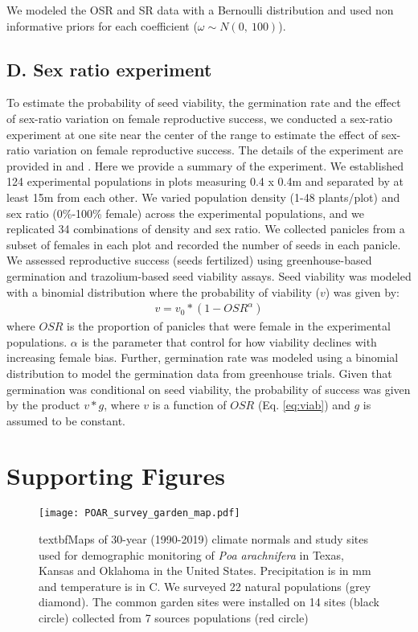 \documentclass[9pt,twoside,lineno]{pnas-new}
\begin{document}
We modeled the OSR and SR data with a Bernoulli distribution and used non informative priors for each coefficient ($\omega \sim N(0,\ 100)$). 

\subsection*{D. Sex ratio experiment} 
To estimate the probability of seed viability,  the germination rate and the effect of sex-ratio variation on female reproductive success, we conducted a sex-ratio experiment at one site near the center of the range to estimate the effect of sex-ratio variation on female reproductive success.
The details of the experiment are provided in \cite{compagnoni2017can} and \cite{miller2022two}.
Here we provide a summary of the experiment.
We established 124 experimental populations in plots measuring 0.4 x 0.4m and separated by at least 15m from each other.
We varied population density (1-48 plants/plot) and sex ratio (0\%-100\% female) across the experimental populations, and we replicated 34 combinations of density and sex ratio.
We collected panicles from a subset of females in each plot and recorded the number of seeds in each panicle.
We assessed reproductive success (seeds fertilized) using greenhouse-based germination and trazolium-based seed viability assays.
Seed viability was modeled with a binomial distribution where the probability of viability ($v$) was given by:
\begin{align}\label{eq:viab}
	v = v_{0} * (1 - OSR^{\alpha})
\end{align}
\noindent where $OSR$ is the proportion of panicles that were female in the experimental populations.
$\alpha$ is the parameter that control for how viability declines with increasing female bias.
Further, germination rate was modeled using a binomial distribution to model the germination data from greenhouse trials.
Given that germination was conditional on seed viability, the probability of success was given by the product $v*g$, where $v$ is a function of $OSR$ (Eq. \ref{eq:viab}) and $g$ is assumed to be constant.

\clearpage
\section*{Supporting Figures}
\begin{figure}[H]
\centering
\texttt{[image: POAR\_survey\_garden\_map.pdf]}
\caption{textbf{Maps of 30-year (1990-2019) climate normals and study sites used for demographic monitoring of \emph{Poa arachnifera} in Texas, Kansas and Oklahoma in the United States}.
 Precipitation is in mm and temperature is in \degree  C.
 We surveyed 22 natural populations (grey diamond).
 The common garden sites were installed on 14 sites (black circle) collected from 7 sources populations (red circle)}
 \label{Sup:long_lat_garden}
\end{figure}
\clearpage
\end{document}
